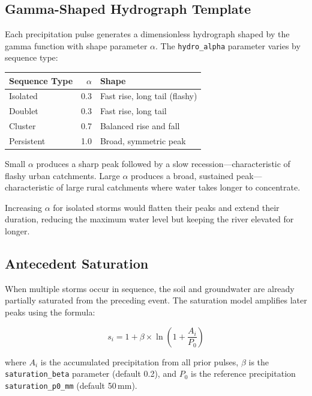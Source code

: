 \documentclass[11pt,a4paper]{article}
\begin{document}
\subsection{Gamma-Shaped Hydrograph Template}

Each precipitation pulse generates a dimensionless hydrograph shaped by
the gamma function with shape parameter $\alpha$.  The
\texttt{hydro\_alpha} parameter varies by sequence type:

\begin{center}
\begin{tabular}{lrl}
\toprule
\textbf{Sequence Type} & \textbf{$\alpha$} & \textbf{Shape} \\
\midrule
Isolated   & 0.3 & Fast rise, long tail (flashy) \\
Doublet    & 0.3 & Fast rise, long tail \\
Cluster    & 0.7 & Balanced rise and fall \\
Persistent & 1.0 & Broad, symmetric peak \\
\bottomrule
\end{tabular}
\end{center}

\noindent Small $\alpha$ produces a sharp peak followed by a slow
recession---characteristic of flashy urban catchments.  Large $\alpha$
produces a broad, sustained peak---characteristic of large rural
catchments where water takes longer to concentrate.

Increasing $\alpha$ for isolated storms would flatten their peaks and
extend their duration, reducing the maximum water level but keeping the
river elevated for longer.

\subsection{Antecedent Saturation}

When multiple storms occur in sequence, the soil and groundwater are
already partially saturated from the preceding event.  The saturation
model amplifies later peaks using the formula:

\[
  s_i = 1 + \beta \times \ln\!\left(1 + \frac{A_i}{P_0}\right)
\]

\noindent where $A_i$ is the accumulated precipitation from all prior
pulses, $\beta$ is the \texttt{saturation\_beta} parameter (default
0.2), and $P_0$ is the reference precipitation
\texttt{saturation\_p0\_mm} (default 50\,mm).
\end{document}
